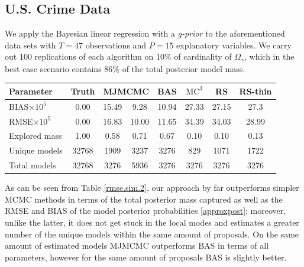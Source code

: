 \documentclass[a0,portrait]{a0poster}
\begin{document}
\begin{multicols}{2}
\subsection*{U.S. Crime Data}
\color{DarkSlateGray} %
We apply the Bayesian linear regression with a \textit{g-prior} \cite{Clyde:Ghosh:Littman:2010} to the aforementioned data sets with $T = 47$ observations and $P = 15$ explanatory variables. We carry out 100 replications of each algorithm on 10\% of cardinality of $\Omega_{\gamma}$, which in the best case scenario contains 86\% of the total posterior model mass.
\begin{center}\vspace{1cm} 
\begin{tabular}{ 
lccccccc}
\hline
\textbf{Parameter}&\textbf{Truth}&\multicolumn{2}{c}{\textbf{MJMCMC}}&\textbf{BAS}&\textbf{$\text{MC}^3$}&\textbf{RS}&\textbf{RS-thin}\\\hline
BIAS$\times 10^5$&0.00&15.49&9.28&10.94&27.33&27.15&27.3\\ 
RMSE$\times 10^5$&0.00&16.83&10.00&11.65&34.39&34.03&28.99\\ 
Explored mass&1.00&0.58&0.71&0.67&0.10&0.10&0.13\\ 
Unique models&32768&1909&3237&3276&829&1071&1722\\ 
Total models&32768&3276&5936&3276&3276&3276&3276\\ 
\hline
\end{tabular}
\label{rmse.sim.2}
\end{center}\vspace{1cm} 

As can be seen from Table \ref{rmse.sim.2}, our approach by far outperforms simpler MCMC methods in terms of the total posterior mass captured \cite{Clyde:Ghosh:Littman:2010,Hubin2016} as well as the RMSE and BIAS \cite{Clyde:Ghosh:Littman:2010,Hubin2016} of the model posterior probabilities \eqref{approxpost}; moreover, unlike the latter, it does not get stuck in the local modes and estimates a greater number of the unique models within the same amount of proposals. On the  same amount of estimated models MJMCMC outperforms BAS in terms of all parameters, however for the same amount of proposals BAS is slightly better. 
\color{teal} %

\end{multicols}
\end{document}
